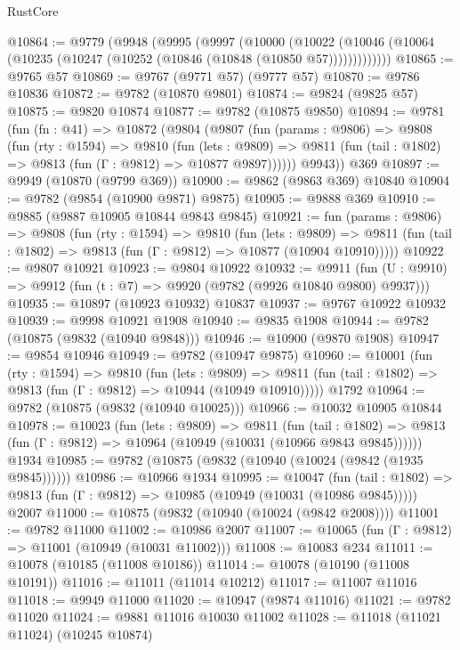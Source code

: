\begin{lexlean}{RustCore}
\begin{coremodule}
@10864 := @9779
    (@9948
      (@9995
        (@9997
          (@10000
            (@10022 (@10046 (@10064 (@10235 (@10247 (@10252 (@10846 (@10848 (@10850 @57)))))))))))))
@10865 := @9765 @57
@10869 := @9767 (@9771 @57) (@9777 @57)
@10870 := @9786 @10836
@10872 := @9782 (@10870 @9801)
@10874 := @9824 (@9825 @57)
@10875 := @9820 @10874
@10877 := @9782 (@10875 @9850)
@10894 := @9781
    (fun (fn : @41) =>
    @10872
      (@9804
        (@9807
          (fun (params : @9806) =>
          @9808
            (fun (rty : @1594) =>
            @9810
              (fun (lets : @9809) =>
              @9811 (fun (tail : @1802) => @9813 (fun (Γ : @9812) => @10877 @9897))))))
        @9943))
    @369
@10897 := @9949 (@10870 (@9799 @369))
@10900 := @9862 (@9863 @369) @10840
@10904 := @9782 (@9854 (@10900 @9871) @9875)
@10905 := @9888 @369
@10910 := @9885 (@9887 @10905 @10844 @9843 @9845)
@10921 := fun (params : @9806) =>
  @9808
    (fun (rty : @1594) =>
    @9810
      (fun (lets : @9809) =>
      @9811 (fun (tail : @1802) => @9813 (fun (Γ : @9812) => @10877 (@10904 @10910)))))
@10922 := @9807 @10921
@10923 := @9804 @10922
@10932 := @9911
    (fun (U : @9910) => @9912 (fun (t : @7) => @9920 (@9782 (@9926 @10840 @9800) @9937)))
@10935 := @10897 (@10923 @10932) @10837
@10937 := @9767 @10922 @10932
@10939 := @9998 @10921 @1908
@10940 := @9835 @1908
@10944 := @9782 (@10875 (@9832 (@10940 @9848)))
@10946 := @10900 (@9870 @1908)
@10947 := @9854 @10946
@10949 := @9782 (@10947 @9875)
@10960 := @10001
    (fun (rty : @1594) =>
    @9810
      (fun (lets : @9809) =>
      @9811 (fun (tail : @1802) => @9813 (fun (Γ : @9812) => @10944 (@10949 @10910)))))
    @1792
@10964 := @9782 (@10875 (@9832 (@10940 @10025)))
@10966 := @10032 @10905 @10844
@10978 := @10023
    (fun (lets : @9809) =>
    @9811
      (fun (tail : @1802) =>
      @9813 (fun (Γ : @9812) => @10964 (@10949 (@10031 (@10966 @9843 @9845))))))
    @1934
@10985 := @9782 (@10875 (@9832 (@10940 (@10024 (@9842 (@1935 @9845))))))
@10986 := @10966 @1934
@10995 := @10047
    (fun (tail : @1802) => @9813 (fun (Γ : @9812) => @10985 (@10949 (@10031 (@10986 @9845)))))
    @2007
@11000 := @10875 (@9832 (@10940 (@10024 (@9842 @2008))))
@11001 := @9782 @11000
@11002 := @10986 @2007
@11007 := @10065 (fun (Γ : @9812) => @11001 (@10949 (@10031 @11002)))
@11008 := @10083 @234
@11011 := @10078 (@10185 (@11008 @10186))
@11014 := @10078 (@10190 (@11008 @10191))
@11016 := @11011 (@11014 @10212)
@11017 := @11007 @11016
@11018 := @9949 @11000
@11020 := @10947 (@9874 @11016)
@11021 := @9782 @11020
@11024 := @9881 @11016 @10030 @11002
@11028 := @11018 (@11021 @11024) (@10245 @10874)

\end{coremodule}
\end{lexlean}
